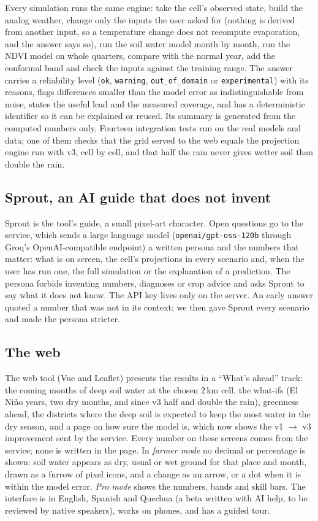 \documentclass[11pt,a4paper]{article}
\begin{document}
Every simulation runs the same engine: take the cell's observed state, build the analog weather, change only the inputs
the user asked for (nothing is derived from another input, so a temperature change does not recompute evaporation, and
the answer says so), run the soil water model month by month, run the NDVI model on whole quarters, compare with the
normal year, add the conformal band and check the inputs against the training range. The answer carries a reliability
level (\texttt{ok}, \texttt{warning}, \texttt{out\_of\_domain} or \texttt{experimental}) with its reasons, flags differences
smaller than the model error as indistinguishable from noise, states the useful lead and the measured coverage, and has a
deterministic identifier so it can be explained or reused. Its summary is generated from the computed numbers only.
Fourteen integration tests run on the real models and data; one of them checks that the grid served to the web equals the
projection engine run with v3, cell by cell, and that half the rain never gives wetter soil than double the rain.

\subsection{Sprout, an AI guide that does not invent}\label{sec:sprout}
Sprout is the tool's guide, a small pixel-art character. Open questions go to the service, which sends a large language
model (\texttt{openai/gpt-oss-120b} through Groq's OpenAI-compatible endpoint) a written persona and the numbers that
matter: what is on screen, the cell's projections in every scenario and, when the user has run one, the full simulation or
the explanation of a prediction. The persona forbids inventing numbers, diagnoses or crop advice and asks Sprout to say
what it does not know. The API key lives only on the server. An early answer quoted a number that was not in its context;
we then gave Sprout every scenario and made the persona stricter.

\subsection{The web}
The web tool (Vue and Leaflet) presents the results in a ``What's ahead'' track: the coming months of deep soil water at
the chosen 2\,km cell, the what-ifs (El Ni\~no years, two dry months, and since v3 half and double the rain), greenness
ahead, the districts where the deep soil is expected to keep the most water in the dry season, and a page on how sure the
model is, which now shows the v1 $\to$ v3 improvement sent by the service. Every number on these screens comes from the
service; none is written in the page. In \emph{farmer mode} no decimal or percentage is shown: soil water appears as dry,
usual or wet ground for that place and month, drawn as a furrow of pixel icons, and a change as an arrow, or a dot when it
is within the model error. \emph{Pro mode} shows the numbers, bands and skill bars. The interface is in English, Spanish and
Quechua (a beta written with AI help, to be reviewed by native speakers), works on phones, and has a guided tour.
\end{document}
